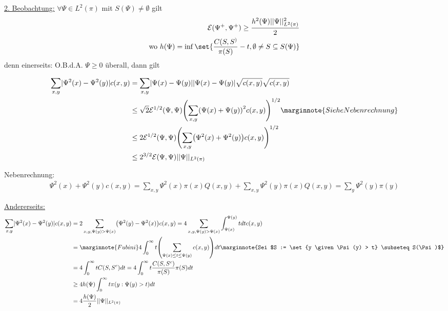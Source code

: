 \begin{beweis}
	\underline{2. Beobachtung:} $\forall \Psi \in L^2(\pi)$ mit $S(\Psi) \neq \emptyset$ gilt
	\begin{align}
		\mathcal{E} (\Psi^+,\Psi^+) \geq \frac{h^2(\Psi) ||\Psi||^2_{L^2(\pi)}}{2} \\
		\text{wo } h(\Psi) = \inf \set{ \frac{C(S,S^)}{\pi(S)} - t, \emptyset \neq S \subseteq S(\Psi)  }
	\end{align}
	denn einerseits: O.B.d.A. $\Psi \geq 0$ überall, dann gilt
	
	\begin{align}
		\sum\limits_{x,y} \abs{\Psi^2(x) - \Psi^2(y)} c(x,y) &= \sum\limits_{x,y} \abs{\Psi(x) - \Psi(y)} \abs{\Psi(x) - \Psi(y)} \sqrt{c(x,y)} \sqrt{c(x,y)} \\
		&\leq \sqrt{2} \mathcal{E}^{1/2} (\Psi,\Psi) \enb{\sum\limits_{x,y}\enb{\Psi(x) + \Psi(y)}^2 c(x,y) }^{1/2} \marginnote{Siehe Nebenrechnung}\\
		&\leq 2 \mathcal{E}^{1/2}(\Psi,\Psi) \enb{\sum\limits_{x,y} \enb{\Psi^2(x) + \Psi^2(y) } c(x,y) }^{1/2} \\
		&\leq 2^{3/2} \mathcal{E} (\Psi,\Psi) || \Psi ||_{L^2(\pi)}
	\end{align}
	
	Nebenrechnung: 
	\begin{align}
		\Psi^2(x) + \Psi^2(y) c(x,y) = \sum\limits_{x,y} \Psi^2(x) \pi(x) Q(x,y) + \sum\limits_{x,y} \Psi^2(y) \pi(x) Q(x,y) = \sum\limits_{y}\Psi^2(y)\pi(y)
	\end{align}
	
	\underline{Andererseits:} 
	\begin{align}
		\sum\limits_{x,y} \abs{\Psi^2(x) - \Psi^2(y)}c(x,y) &= 2 \sum\limits_{x,y, \Psi(y) > \Psi(x)} \enb{\Psi^2(y) - \Psi^2(x)} c(x,y) = 4 \sum\limits_{x,y, \Psi(y) > \Psi(x)} \int_{\Psi(x)}^{\Psi(y)} t dt c(x,y) \\
		&= \marginnote{Fubini} 4 \int_{0}^{\infty} t\enb{\sum\limits_{\Psi(x) \leq t \leq \Psi(y)} c(x,y) } dt \marginnote{Sei $S := \set{y \given \Psi(y) > t} \subseteq S(\Psi)$} \\
		&= 4 \int_{0}^{\infty} t C(S,S^c) dt = 4 \int_{0}^{\infty} t \frac{C(S,S^c)}{\pi(S)} \pi(S) dt \\
		&\geq 4h(\Psi) \int_{0}^{\infty} t \pi(y : \Psi(y) > t) dt \\
		&= 4 \frac{h(\Psi)}{2} || \Psi ||_{L^2(\pi)}
	\end{align}		
	

\end{beweis}
